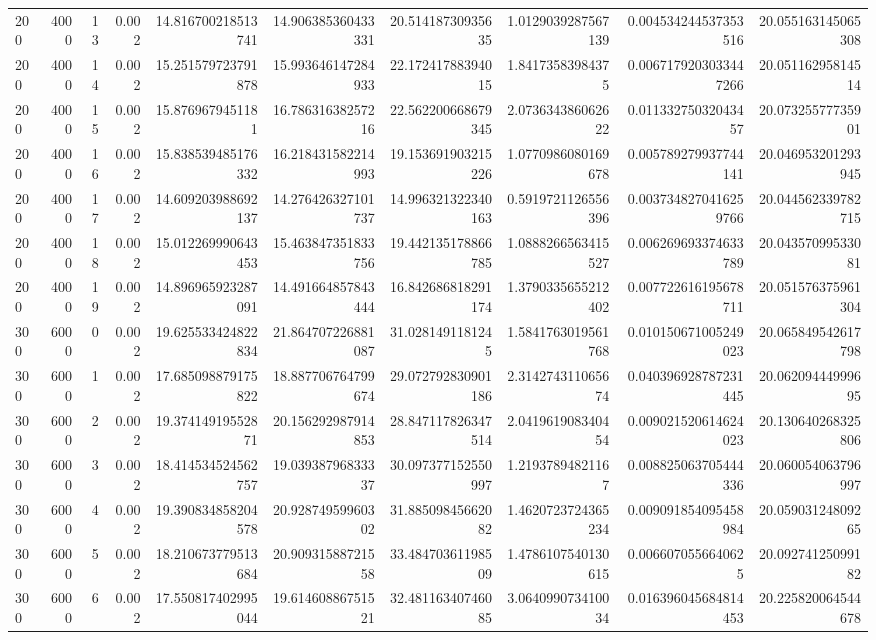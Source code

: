 \begin{tabular}{lrrrrrrrrr}
200 & 4000 & 13 & 0.002 & 14.816700218513741 & 14.906385360433331 & 20.51418730935635 & 1.0129039287567139 & 0.004534244537353516 & 20.055163145065308 \\
200 & 4000 & 14 & 0.002 & 15.251579723791878 & 15.993646147284933 & 22.17241788394015 & 1.84173583984375 & 0.0067179203033447266 & 20.05116295814514 \\
200 & 4000 & 15 & 0.002 & 15.8769679451181 & 16.78631638257216 & 22.562200668679345 & 2.073634386062622 & 0.01133275032043457 & 20.07325577735901 \\
200 & 4000 & 16 & 0.002 & 15.838539485176332 & 16.218431582214993 & 19.153691903215226 & 1.0770986080169678 & 0.005789279937744141 & 20.046953201293945 \\
200 & 4000 & 17 & 0.002 & 14.609203988692137 & 14.276426327101737 & 14.996321322340163 & 0.5919721126556396 & 0.0037348270416259766 & 20.044562339782715 \\
200 & 4000 & 18 & 0.002 & 15.012269990643453 & 15.463847351833756 & 19.442135178866785 & 1.0888266563415527 & 0.006269693374633789 & 20.04357099533081 \\
200 & 4000 & 19 & 0.002 & 14.896965923287091 & 14.491664857843444 & 16.842686818291174 & 1.3790335655212402 & 0.007722616195678711 & 20.051576375961304 \\
300 & 6000 & 0 & 0.002 & 19.625533424822834 & 21.864707226881087 & 31.0281491181245 & 1.5841763019561768 & 0.010150671005249023 & 20.065849542617798 \\
300 & 6000 & 1 & 0.002 & 17.685098879175822 & 18.887706764799674 & 29.072792830901186 & 2.314274311065674 & 0.040396928787231445 & 20.06209444999695 \\
300 & 6000 & 2 & 0.002 & 19.37414919552871 & 20.156292987914853 & 28.847117826347514 & 2.041961908340454 & 0.009021520614624023 & 20.130640268325806 \\
300 & 6000 & 3 & 0.002 & 18.414534524562757 & 19.03938796833337 & 30.097377152550997 & 1.21937894821167 & 0.008825063705444336 & 20.060054063796997 \\
300 & 6000 & 4 & 0.002 & 19.390834858204578 & 20.92874959960302 & 31.88509845662082 & 1.4620723724365234 & 0.009091854095458984 & 20.05903124809265 \\
300 & 6000 & 5 & 0.002 & 18.210673779513684 & 20.90931588721558 & 33.48470361198509 & 1.4786107540130615 & 0.0066070556640625 & 20.09274125099182 \\
300 & 6000 & 6 & 0.002 & 17.550817402995044 & 19.61460886751521 & 32.48116340746085 & 3.064099073410034 & 0.016396045684814453 & 20.225820064544678 \\

\end{tabular}
